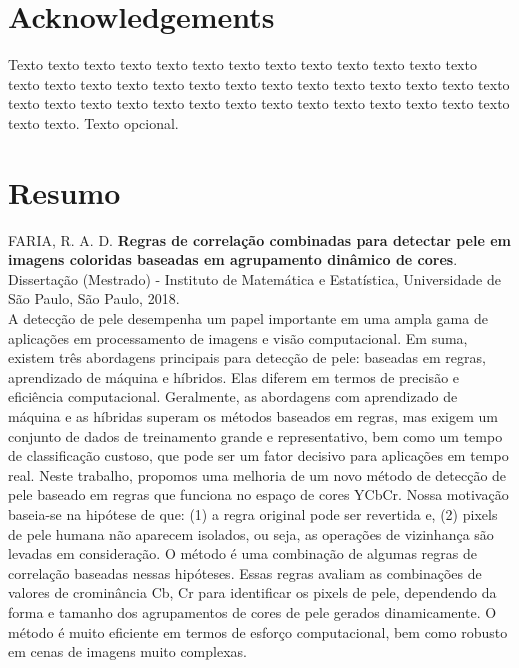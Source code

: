 \documentclass[11pt,twoside,a4paper]{book}
\theoremstyle{plain}
\theoremstyle{definition}
\begin{document}



\chapter*{Acknowledgements}
Texto texto texto texto texto texto texto texto texto texto texto texto texto
texto texto texto texto texto texto texto texto texto texto texto texto texto
texto texto texto texto texto texto texto texto texto texto texto texto texto
texto texto texto texto. Texto opcional.


\chapter*{Resumo}

\noindent FARIA, R. A. D. \textbf{Regras de correlação combinadas para detectar pele em imagens coloridas baseadas em agrupamento dinâmico de cores}.
Dissertação (Mestrado) - Instituto de Matemática e Estatística,
Universidade de São Paulo, São Paulo, 2018.
\\

A detecção de pele desempenha um papel importante em uma ampla gama de aplicações em processamento de imagens e visão computacional. Em suma, existem três abordagens principais para detecção de pele: baseadas em regras, aprendizado de máquina e híbridos. Elas diferem em termos de precisão e eficiência computacional. Geralmente, as abordagens com aprendizado de máquina e as híbridas superam os métodos baseados em regras, mas exigem um conjunto de dados de treinamento grande e representativo, bem como um tempo de classificação custoso, que pode ser um fator decisivo para aplicações em tempo real. Neste trabalho, propomos uma melhoria de um novo método de detecção de pele baseado em regras que funciona no espaço de cores YCbCr. Nossa motivação baseia-se na hipótese de que: (1) a regra original pode ser revertida e, (2) pixels de pele humana não aparecem isolados, ou seja, as operações de vizinhança são levadas em consideração. O método é uma combinação de algumas regras de correlação baseadas nessas hipóteses. Essas regras avaliam as combinações de valores de crominância Cb, Cr para identificar os pixels de pele, dependendo da forma e tamanho dos agrupamentos de cores de pele gerados dinamicamente. O método é muito eficiente em termos de esforço computacional, bem como robusto em cenas de imagens muito complexas.
\\
\end{document}
